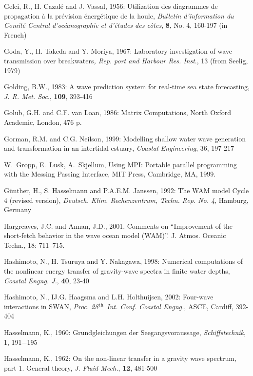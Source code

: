 \documentclass[12pt]{book}
\begin{document}
\begin{thebibliography}{10}
Gelci, R., H. Cazal\'{e} and J. Vassal, 1956: Utilization des diagrammes de propagation \`{a} la pr\'{e}vision
\'{e}nerg\'{e}tique de la houle, {\it Bulletin d'information du Comit\'{e} Central d'oc\'{e}anographie et d'\'{e}tudes
des c\^{o}tes}, {\bf 8}, No. 4, 160-197 (in French)

Goda, Y., H. Takeda and Y. Moriya, 1967: Laboratory investigation of wave transmission over breakwaters{\it ,
Rep. port and Harbour Res. Inst}., 13 (from Seelig, 1979)

Golding, B.W., 1983: A wave prediction system for real-time sea state forecasting, {\it J. R. Met. Soc}., {\bf 109},
393-416

Golub, G.H. and C.F. van Loan, 1986: Matrix Computations, North Oxford Academic, London, 476 p.

Gorman, R.M. and C.G. Neilson, 1999: Modelling shallow water wave generation and transformation in
an intertidal estuary, {\it Coastal Engineering}, 36, 197-217

W.~Gropp, E.~Lusk, A.~Skjellum, Using {MPI}: {P}ortable parallel programming
  with the {M}essing {P}assing {I}nterface, MIT Press, Cambridge, MA, 1999.

G\"{u}nther, H., S. Hasselmann and P.A.E.M. Janssen, 1992: The WAM model Cycle 4 (revised version),
{\it Deutsch. Klim. Rechenzentrum, Techn. Rep. No. 4}, Hamburg, Germany

Hargreaves, J.C. and Annan, J.D., 2001. Comments on ``{I}mprovement of the short-fetch behavior
  in the wave ocean model ({WAM})''. J. Atmos. Oceanic Techn., 18: 711--715.

Hashimoto, N., H. Tsuruya and Y. Nakagawa, 1998: Numerical computations of the nonlinear energy
transfer of gravity-wave spectra in finite water depths, {\it Coastal Engng. J.}, {\bf 40}, 23-40

Hashimoto, N., IJ.G. Haagsma and L.H. Holthuijsen, 2002: Four-wave interactions in SWAN, {\it Proc. 28$^{{\rm th}}$
Int. Conf. Coastal Engng.}, ASCE, Cardiff, 392-404

Hasselmann, K., 1960: Grundgleichungen der Seegangsvoraussage, {\it Schiffstechnik}, 1,  191$-$195

Hasselmann, K., 1962: On the non-linear transfer in a gravity wave spectrum, part 1. {G}eneral theory,
{\it J. Fluid Mech.}, {\bf 12}, 481-500


\end{thebibliography}
\end{document}
